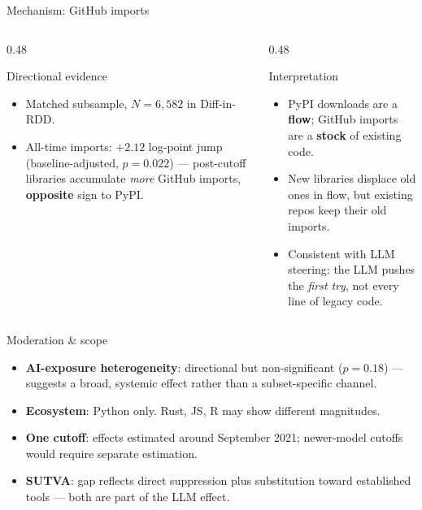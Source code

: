 \documentclass[10pt, aspectratio=169]{beamer}
\begin{document}
\begin{frame}{Mechanism: GitHub imports}
    \begin{columns}[T]
        \begin{column}{0.48\textwidth}
            \begin{block}{Directional evidence}
                \begin{itemize}
                    \item Matched subsample, $N = 6{,}582$ in Diff-in-RDD.
                    \item All-time imports: $+2.12$ log-point jump (baseline-adjusted, $p = 0.022$) --- post-cutoff libraries accumulate \emph{more} GitHub imports, \textbf{opposite} sign to PyPI.
                \end{itemize}
            \end{block}
        \end{column}
        \begin{column}{0.48\textwidth}
            \begin{block}{Interpretation}
                \begin{itemize}
                    \item PyPI downloads are a \textbf{flow}; GitHub imports are a \textbf{stock} of existing code.
                    \item New libraries displace old ones in flow, but existing repos keep their old imports.
                    \item Consistent with LLM steering: the LLM pushes the \emph{first try}, not every line of legacy code.
                \end{itemize}
            \end{block}
        \end{column}
    \end{columns}
\end{frame}

\begin{frame}{Moderation \& scope}
    \begin{itemize}
        \item \textbf{AI-exposure heterogeneity}: directional but non-significant ($p = 0.18$) --- suggests a broad, systemic effect rather than a subset-specific channel.
        \item \textbf{Ecosystem}: Python only. Rust, JS, R may show different magnitudes.
        \item \textbf{One cutoff}: effects estimated around September 2021; newer-model cutoffs would require separate estimation.
        \item \textbf{SUTVA}: gap reflects direct suppression plus substitution toward established tools --- both are part of the LLM effect.
    \end{itemize}
\end{frame}
\end{document}
